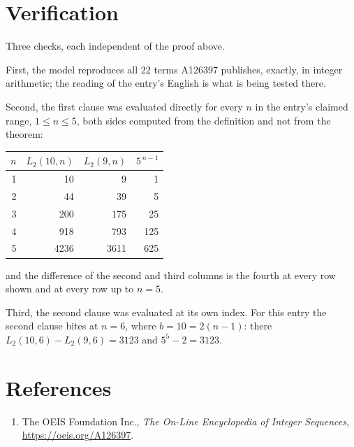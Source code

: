 \documentclass[11pt,a4paper]{article}
\theoremstyle{plain}
\theoremstyle{definition}
\begin{document}
\section{Verification}

Three checks, each independent of the proof above.

First, the model reproduces all $22$ terms A126397 publishes, exactly, in integer
arithmetic; the reading of the entry's English is what is being tested there.

Second, the first clause was evaluated directly for every $n$ in the entry's claimed range,
$1\le n\le5$, both sides computed from the definition and not from the theorem:

\begin{center}
\begin{tabular}{rrrr}
$n$ & $L_{2}(10,n)$ & $L_{2}(9,n)$ & $5^{\,n-1}$ \\ \hline
1 & 10 & 9 & 1 \\
2 & 44 & 39 & 5 \\
3 & 200 & 175 & 25 \\
4 & 918 & 793 & 125 \\
5 & 4236 & 3611 & 625 \\
\end{tabular}
\end{center}

\noindent and the difference of the second and third columns is the fourth at every row shown
and at every row up to $n=5$.

Third, the second clause was evaluated at its own index. For this entry the second clause bites at $n=6$, where $b=10=2(n-1)$: there $L_{2}(10,6)-L_{2}(9,6)=3123$ and $5^{5}-2=3123$.

\section*{References}
\begin{enumerate}
\item The OEIS Foundation Inc., \emph{The On-Line Encyclopedia of Integer Sequences},
\url{https://oeis.org/A126397}.
\end{enumerate}
\end{document}
